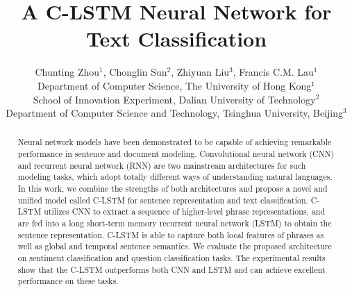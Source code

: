 \documentclass[11pt,letterpaper]{article}
\title{A C-LSTM Neural Network for Text Classification}
\date{}
\author{{Chunting Zhou}$^{1}$, Chonglin Sun$^{2}$, Zhiyuan Liu$^{3}$, Francis C.M. Lau$^{1}$\\
Department of Computer Science, The University of Hong Kong$^{1}$\\
School of Innovation Experiment, Dalian University of Technology$^{2}$\\
Department of Computer Science and Technology, Tsinghua University, Beijing$^{3}$\\
}
\begin{document}
\maketitle

\begin{abstract}
Neural network models have been demonstrated to be capable of achieving
remarkable performance in sentence and document modeling.
Convolutional neural network (CNN) and recurrent neural network
(RNN) are two mainstream architectures for such modeling tasks, which
adopt totally different ways of understanding natural languages.
In this work, we combine the strengths of both architectures
and propose a novel and unified model called C-LSTM for sentence
representation and text classification.
C-LSTM utilizes CNN to extract a sequence of higher-level phrase
representations, and are fed into a long short-term
memory recurrent neural network (LSTM) to obtain the sentence
representation.
C-LSTM is able to capture both local features of phrases as
well as global and temporal sentence semantics.
We evaluate the proposed architecture on sentiment classification and
question classification tasks.
The experimental results show that the C-LSTM outperforms both CNN and LSTM and can achieve excellent performance on these tasks.

\end{abstract}
\end{document}
